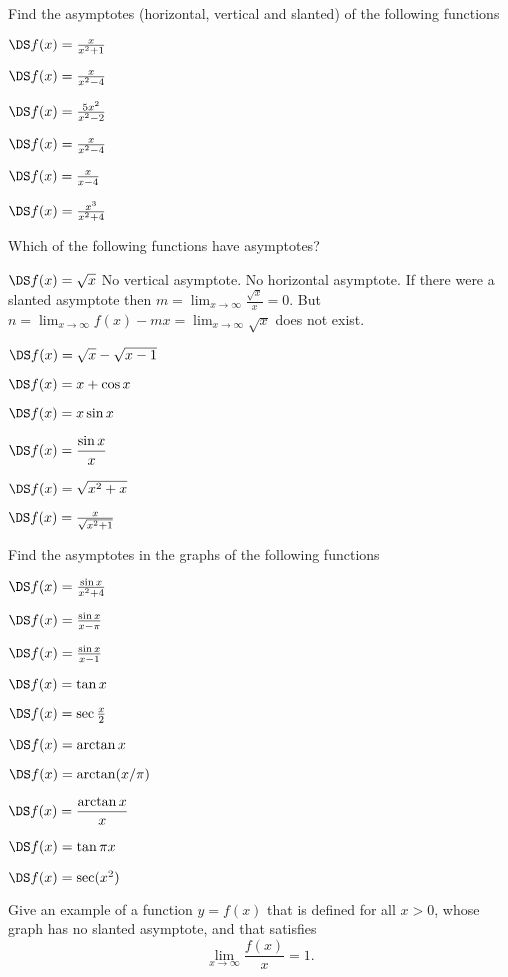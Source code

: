 \begin{multicols}{2}
\problem Find the asymptotes (horizontal, vertical and slanted) of the
following functions

\subprob $\DS f(x) = \frac{x}{x^2+1}$

\subprob $\DS f(x) = \frac{x}{x^2-4}$

\subprob $\DS f(x) = \frac{5x^2}{x^2-2}$

\subprob $\DS f(x) = \frac{x}{x^2-4}$

\subprob $\DS f(x) = \frac{x}{x-4}$

\subprob $\DS f(x) = \frac{x^3}{x^2+4}$

\problem Which of the following functions have asymptotes?

\subprob \(\DS f(x) = \sqrt{x} \)
\answer
No vertical asymptote.  
No horizontal asymptote.  
If there were a slanted asymptote then $m =
\lim_{x\to\infty}\frac{\sqrt{x}}{x} = 0$. But $n = \lim_{x\to\infty}
f(x) - mx = \lim_{x\to\infty}\sqrt{x}$ does not exist.
\endanswer

\subprob \(\DS f(x) = \sqrt{x} - \sqrt{x-1}\)

\subprob \(\DS f(x) = x+ \cos x \)

\subprob \(\DS f(x) = x\sin x \)

\subprob \(\DS f(x) = \dfrac{\sin x}{x} \)

\subprob $\DS f(x) = \sqrt{x^2+x}$

\subprob $\DS f(x) = \frac{x}{\sqrt{x^2+1}}$

\problem Find the asymptotes in the graphs of the following functions

\subprob $\DS f(x) = \frac{\sin x}{x^2+4}$

\subprob $\DS f(x) = \frac{\sin x}{x-\pi}$

\subprob $\DS f(x) = \frac{\sin x}{x-1}$

\subprob $\DS f(x) = \tan x$

\subprob $\DS f(x) = \sec \frac x2$

\subprob $\DS f(x) = \arctan x$

\subprob $\DS f(x) = \arctan (x/\pi)$

\subprob $\DS f(x) = \dfrac{\arctan x}{x}$

\subprob $\DS f(x) = \tan \pi x$

\subprob $\DS f(x) = \sec (x^2)$

\problem Give an example of a function $y=f(x)$ that is defined for
all $x>0$, whose graph has no slanted asymptote, and that satisfies
\[
\lim_{x\to\infty} \frac{f(x)}{x} = 1.
\]


\end{multicols}
